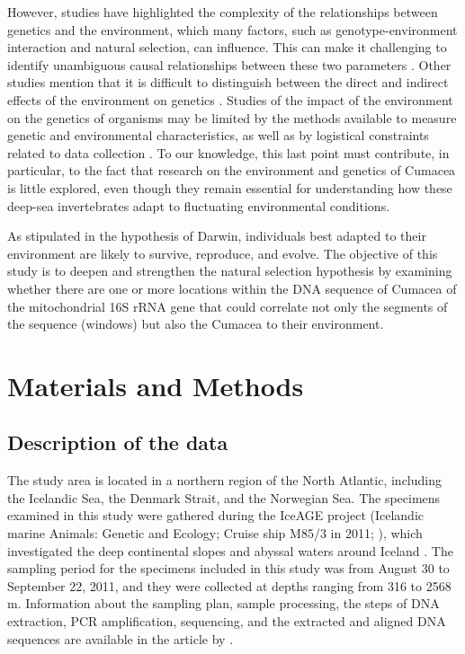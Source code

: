 However, studies have highlighted the complexity of the relationships between genetics and the environment, which many factors, such as genotype-environment interaction and natural selection, can influence. This can make it challenging to identify unambiguous causal relationships between these two parameters \citep{balkenhol_identifying_2009}. Other studies mention that it is difficult to distinguish between the direct and indirect effects of the environment on genetics \citep{manel_perspectives_2010,balkenhol_landscape_2019}. Studies of the impact of the environment on the genetics of organisms may be limited by the methods available to measure genetic and environmental characteristics, as well as by logistical constraints related to data collection \citep{manel_perspectives_2010,shafer_widespread_2013}. To our knowledge, this last point must contribute, in particular, to the fact that research on the environment and genetics of Cumacea is little explored, even though they remain essential for understanding how these deep-sea invertebrates adapt to fluctuating environmental conditions. 

As stipulated in the hypothesis of Darwin, individuals best adapted to their environment are likely to survive, reproduce, and evolve. The objective of this study is to deepen and strengthen the natural selection hypothesis by examining whether there are one or more locations within the DNA sequence of Cumacea of the mitochondrial 16S rRNA gene that could correlate not only the segments of the sequence (windows) but also the Cumacea to their environment.

\section{Materials and Methods}\label{materials-methods}

\subsection{Description of the data}
The study area is located in a northern region of the North Atlantic, including the Icelandic Sea, the Denmark Strait, and the Norwegian Sea. The specimens examined in this study were gathered during the IceAGE project (Icelandic marine Animals: Genetic and Ecology; Cruise ship M85/3 in 2011; \cite{brix_iceage_2014}), which investigated the deep continental slopes and abyssal waters around Iceland \citep{meisner_prefacebiodiversity_2018}. The sampling period for the specimens included in this study was from August 30 to September 22, 2011, and they were collected at depths ranging from 316 to 2568 m.  Information about the sampling plan, sample processing, the steps of DNA extraction, PCR amplification, sequencing, and the extracted and aligned DNA sequences are available in the article by \cite{uhlir_adding_2021}.

